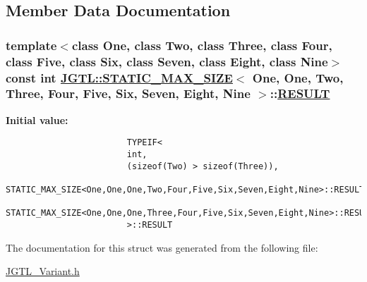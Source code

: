 \subsection{Member Data Documentation}
\hypertarget{struct_j_g_t_l_1_1_s_t_a_t_i_c___m_a_x___s_i_z_e_3_01_one_00_01_one_00_01_two_00_01_three_00_01_f759e6bc76a9114cc8ef25088b44cc11_061c58e801098766aed76b8bb3ed305f}{
\subsubsection[RESULT]{\setlength{\rightskip}{0pt plus 5cm}template$<$class One, class Two, class Three, class Four, class Five, class Six, class Seven, class Eight, class Nine$>$ const int \hyperlink{struct_j_g_t_l_1_1_s_t_a_t_i_c___m_a_x___s_i_z_e}{JGTL::STATIC\_\-MAX\_\-SIZE}$<$ One, One, Two, Three, Four, Five, Six, Seven, Eight, Nine $>$::\hyperlink{struct_j_g_t_l_1_1_s_t_a_t_i_c___m_a_x___s_i_z_e_3_01_one_00_01_one_00_01_two_00_01_three_00_01_f759e6bc76a9114cc8ef25088b44cc11_061c58e801098766aed76b8bb3ed305f}{RESULT}}}
\label{struct_j_g_t_l_1_1_s_t_a_t_i_c___m_a_x___s_i_z_e_3_01_one_00_01_one_00_01_two_00_01_three_00_01_f759e6bc76a9114cc8ef25088b44cc11_061c58e801098766aed76b8bb3ed305f}


\textbf{Initial value:}

\begin{Code}\begin{verbatim}
                        TYPEIF<
                        int,
                        (sizeof(Two) > sizeof(Three)),
                        STATIC_MAX_SIZE<One,One,One,Two,Four,Five,Six,Seven,Eight,Nine>::RESULT,
                        STATIC_MAX_SIZE<One,One,One,Three,Four,Five,Six,Seven,Eight,Nine>::RESULT
                        >::RESULT
\end{verbatim}\end{Code}


The documentation for this struct was generated from the following file:\begin{CompactItemize}
\item 
\hyperlink{_j_g_t_l___variant_8h}{JGTL\_\-Variant.h}\end{CompactItemize}
